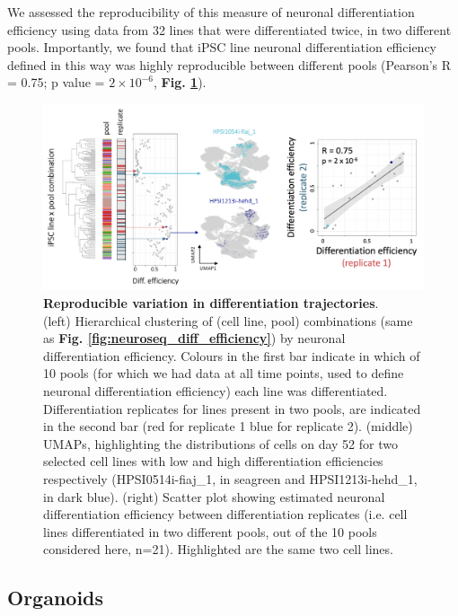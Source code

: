\clearpage

We assessed the reproducibility of this measure of neuronal differentiation efficiency using data from 32 lines that were differentiated twice, in two different pools. 
Importantly, we found that iPSC line neuronal differentiation efficiency defined in this way was highly reproducible between different pools (Pearson's R = 0.75; p value = $2 \times 10^{-6}$, \textbf{Fig. \ref{fig:neuroseq_diff_eff_replication}}).

\begin{figure}[h]
\centering
\includegraphics[width=15.5cm]{Chapter5/Fig/neuroseq_diff_eff_replication.png}
\caption[Reproducible neuronal differentiation efficiency]{\textbf{Reproducible variation in differentiation trajectories}.\\
(left) Hierarchical clustering of (cell line, pool) combinations (same as \textbf{Fig. \ref{fig:neuroseq_diff_efficiency}}) by neuronal differentiation efficiency. 
Colours in the first bar indicate in which of 10 pools (for which we had data at all time points, used to define neuronal differentiation efficiency) each line was differentiated. 
Differentiation replicates for lines present in two pools, are indicated in the second bar (red for replicate 1 blue for replicate 2).
(middle) UMAPs, highlighting the distributions of cells on day 52 for two selected cell lines with low and high differentiation efficiencies respectively (HPSI0514i-fiaj\_1, in seagreen and HPSI1213i-hehd\_1, in dark blue).
(right) Scatter plot showing estimated neuronal differentiation efficiency between differentiation replicates (i.e. cell lines differentiated in two different pools, out of the 10 pools considered here, n=21). 
Highlighted are the same two cell lines.}
\label{fig:neuroseq_diff_eff_replication}
\end{figure}

\subsection{Organoids}
\label{sec:organoids}

